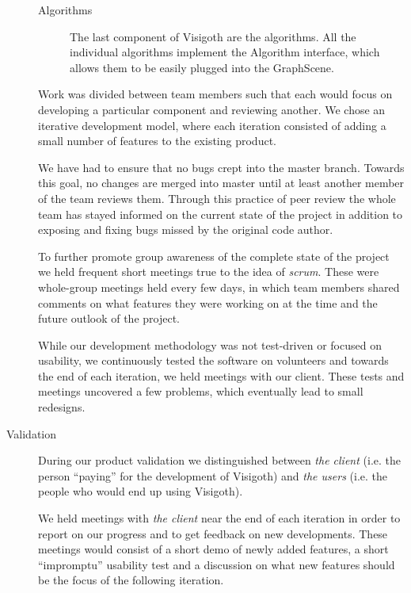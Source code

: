 \documentclass[a4paper,11pt]{article}
\begin{document}
\begin{description}
\begin{description}
      \item[Algorithms] The last component of Visigoth are the algorithms. All
        the individual algorithms implement the Algorithm interface, which
        allows them to be easily plugged into the GraphScene.
    \end{description}

    Work was divided between team members such that each would focus on
    developing a particular component and reviewing another. We chose an
    iterative development model, where each iteration consisted of adding a
    small number of features to the existing product.

    We have had to ensure that no bugs crept into the master branch. Towards
    this goal, no changes are merged into master until at least another member
    of the team reviews them. Through this practice of peer review the whole
    team has stayed informed on the current state of the project in addition to
    exposing and fixing bugs missed by the original code author.

    To further promote group awareness of the complete state of the project we
    held frequent short meetings true to the idea of \emph{scrum}. These were
    whole-group meetings held every few days, in which team members shared
    comments on what features they were working on at the time and the future
    outlook of the project.

    While our development methodology was not test-driven or focused on
    usability, we continuously tested the software on volunteers and towards the
    end of each iteration, we held meetings with our client. These tests and
    meetings uncovered a few problems, which eventually lead to small redesigns.

	\item[Validation]

	During our product validation we distinguished between \emph{the client} (i.e.
	the person ``paying'' for the development of Visigoth) and \emph{the users}
	(i.e. the people who would end up using Visigoth).

	We held meetings with \emph{the client} near the end of each iteration
	in order to report on our progress and to get feedback on new
	developments. These meetings would consist of a short demo of newly
	added features, a short ``impromptu'' usability test and a discussion
	on what new features should be the focus of the following iteration.


\end{description}
\end{document}
